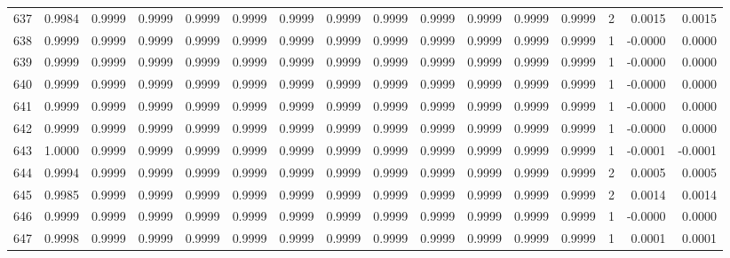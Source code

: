 \begin{tabular}{lrrrrrrrrrrrrrrr}
637 &      0.9984 &  0.9999 &  0.9999 &  0.9999 &  0.9999 &  0.9999 &  0.9999 &  0.9999 &  0.9999 &  0.9999 &   0.9999 &     0.9999 &      2 &                    0.0015 &                     0.0015 \\
638 &      0.9999 &  0.9999 &  0.9999 &  0.9999 &  0.9999 &  0.9999 &  0.9999 &  0.9999 &  0.9999 &  0.9999 &   0.9999 &     0.9999 &      1 &                   -0.0000 &                     0.0000 \\
639 &      0.9999 &  0.9999 &  0.9999 &  0.9999 &  0.9999 &  0.9999 &  0.9999 &  0.9999 &  0.9999 &  0.9999 &   0.9999 &     0.9999 &      1 &                   -0.0000 &                     0.0000 \\
640 &      0.9999 &  0.9999 &  0.9999 &  0.9999 &  0.9999 &  0.9999 &  0.9999 &  0.9999 &  0.9999 &  0.9999 &   0.9999 &     0.9999 &      1 &                   -0.0000 &                     0.0000 \\
641 &      0.9999 &  0.9999 &  0.9999 &  0.9999 &  0.9999 &  0.9999 &  0.9999 &  0.9999 &  0.9999 &  0.9999 &   0.9999 &     0.9999 &      1 &                   -0.0000 &                     0.0000 \\
642 &      0.9999 &  0.9999 &  0.9999 &  0.9999 &  0.9999 &  0.9999 &  0.9999 &  0.9999 &  0.9999 &  0.9999 &   0.9999 &     0.9999 &      1 &                   -0.0000 &                     0.0000 \\
643 &      1.0000 &  0.9999 &  0.9999 &  0.9999 &  0.9999 &  0.9999 &  0.9999 &  0.9999 &  0.9999 &  0.9999 &   0.9999 &     0.9999 &      1 &                   -0.0001 &                    -0.0001 \\
644 &      0.9994 &  0.9999 &  0.9999 &  0.9999 &  0.9999 &  0.9999 &  0.9999 &  0.9999 &  0.9999 &  0.9999 &   0.9999 &     0.9999 &      2 &                    0.0005 &                     0.0005 \\
645 &      0.9985 &  0.9999 &  0.9999 &  0.9999 &  0.9999 &  0.9999 &  0.9999 &  0.9999 &  0.9999 &  0.9999 &   0.9999 &     0.9999 &      2 &                    0.0014 &                     0.0014 \\
646 &      0.9999 &  0.9999 &  0.9999 &  0.9999 &  0.9999 &  0.9999 &  0.9999 &  0.9999 &  0.9999 &  0.9999 &   0.9999 &     0.9999 &      1 &                   -0.0000 &                     0.0000 \\
647 &      0.9998 &  0.9999 &  0.9999 &  0.9999 &  0.9999 &  0.9999 &  0.9999 &  0.9999 &  0.9999 &  0.9999 &   0.9999 &     0.9999 &      1 &                    0.0001 &                     0.0001 \\

\end{tabular}
